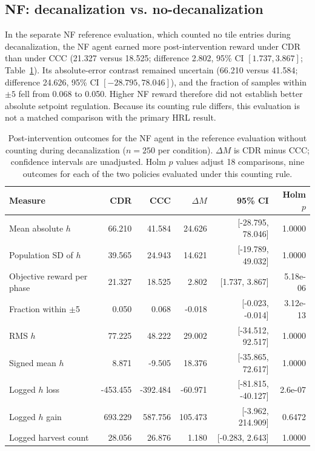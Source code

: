 \documentclass[12pt,fleqn]{article}
\begin{document}
\subsection{NF: decanalization vs. no-decanalization}

In the separate NF reference evaluation, which counted no tile entries during decanalization, the NF agent earned more post-intervention reward under CDR than under CCC (21.327 versus 18.525; difference 2.802, 95\% CI $[1.737, 3.867]$; Table~\ref{model-analysis-nf}). Its absolute-error contrast remained uncertain (66.210 versus 41.584; difference 24.626, 95\% CI $[-28.795, 78.046]$), and the fraction of samples within $\pm5$ fell from 0.068 to 0.050. Higher NF reward therefore did not establish better absolute setpoint regulation. Because its counting rule differs, this evaluation is not a matched comparison with the primary HRL result.

\begin{table}[htbp]
\centering\scriptsize
\setlength{\tabcolsep}{3pt}
\begin{tabular}{@{}lrrrrr@{}}
\toprule
Measure & CDR & CCC & $\Delta M$ & 95\% CI & Holm $p$\\
\midrule
Mean absolute $h$ & 66.210 & 41.584 & 24.626 & [-28.795, 78.046] & 1.0000 \\
Population SD of $h$ & 39.565 & 24.943 & 14.621 & [-19.789, 49.032] & 1.0000 \\
Objective reward per phase & 21.327 & 18.525 & 2.802 & [1.737, 3.867] & 5.18e-06 \\
Fraction within $\pm$5 & 0.050 & 0.068 & -0.018 & [-0.023, -0.014] & 3.12e-13 \\
RMS $h$ & 77.225 & 48.222 & 29.002 & [-34.512, 92.517] & 1.0000 \\
Signed mean $h$ & 8.871 & -9.505 & 18.376 & [-35.865, 72.617] & 1.0000 \\
Logged $h$ loss & -453.455 & -392.484 & -60.971 & [-81.815, -40.127] & 2.6e-07 \\
Logged $h$ gain & 693.229 & 587.756 & 105.473 & [-3.962, 214.909] & 0.6472 \\
Logged harvest count & 28.056 & 26.876 & 1.180 & [-0.283, 2.643] & 1.0000 \\
\bottomrule
\end{tabular}
\caption{Post-intervention outcomes for the NF agent in the reference evaluation without counting during decanalization ($n=250$ per condition). $\Delta M$ is CDR minus CCC; confidence intervals are unadjusted. Holm $p$ values adjust 18 comparisons, nine outcomes for each of the two policies evaluated under this counting rule.}
\label{model-analysis-nf}
\end{table}
\end{document}
